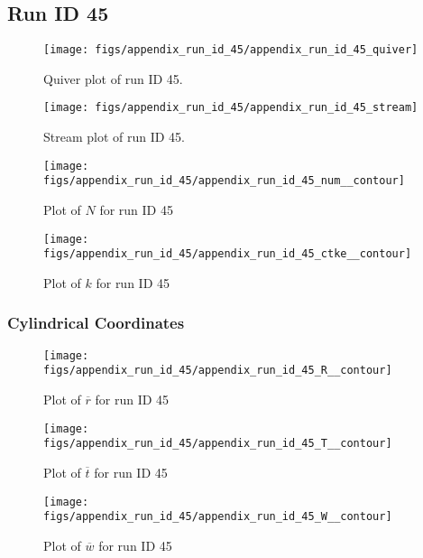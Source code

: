 \subsection{Run ID 45}
\begin{figure}[H]
\centering
\texttt{[image: figs/appendix\_run\_id\_45/appendix\_run\_id\_45\_quiver]}
\caption{Quiver plot of run ID 45.}
\label{fig:appendix_run_id_45_quiver}
\end{figure}


\begin{figure}[H]
\centering
\texttt{[image: figs/appendix\_run\_id\_45/appendix\_run\_id\_45\_stream]}
\caption{Stream plot of run ID 45.}
\label{fig:appendix_run_id_45_stream}
\end{figure}


\begin{figure}[H]
\centering
\texttt{[image: figs/appendix\_run\_id\_45/appendix\_run\_id\_45\_num\_\_contour]}
\caption{Plot of $N$ for run ID 45}
\label{fig:appendix_run_id_45_num__contour}
\end{figure}


\begin{figure}[H]
\centering
\texttt{[image: figs/appendix\_run\_id\_45/appendix\_run\_id\_45\_ctke\_\_contour]}
\caption{Plot of $k$ for run ID 45}
\label{fig:appendix_run_id_45_ctke__contour}
\end{figure}


\subsubsection{Cylindrical Coordinates}
\begin{figure}[H]
\centering
\texttt{[image: figs/appendix\_run\_id\_45/appendix\_run\_id\_45\_R\_\_contour]}
\caption{Plot of $\overline{r}$ for run ID 45}
\label{fig:appendix_run_id_45_R__contour}
\end{figure}


\begin{figure}[H]
\centering
\texttt{[image: figs/appendix\_run\_id\_45/appendix\_run\_id\_45\_T\_\_contour]}
\caption{Plot of $\overline{t}$ for run ID 45}
\label{fig:appendix_run_id_45_T__contour}
\end{figure}


\begin{figure}[H]
\centering
\texttt{[image: figs/appendix\_run\_id\_45/appendix\_run\_id\_45\_W\_\_contour]}
\caption{Plot of $\overline{w}$ for run ID 45}
\label{fig:appendix_run_id_45_W__contour}
\end{figure}


